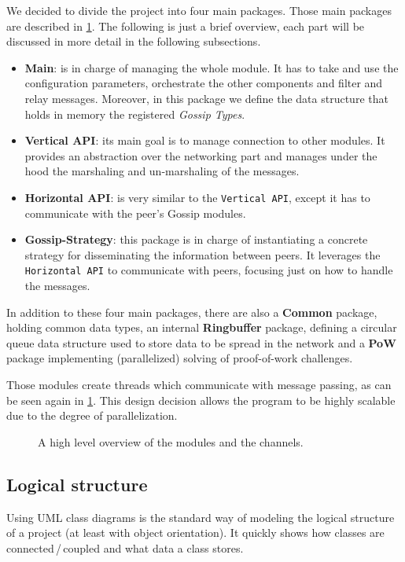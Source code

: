 \documentclass[a4paper,english,10pt,NET]{tumarticle}
\begin{document}
We decided to divide the project into four main packages. Those main packages are described in \cref{fig:overview}. The following is just a brief overview, each part will be discussed in more detail in the following subsections.

\begin{itemize}
	\item \textbf{Main}: is in charge of managing the whole module. It has to take and use the configuration parameters, orchestrate the other components and filter and relay messages. Moreover, in this package we define the data structure that holds in memory the registered \textit{Gossip Types}.
	\item \textbf{Vertical API}: its main goal is to manage connection to other modules. It provides an abstraction over the networking part and manages under the hood the marshaling and un-marshaling of the messages.
	\item \textbf{Horizontal API}: is very similar to the \texttt{Vertical API}, except it has to communicate with the peer's Gossip modules.
	\item \textbf{Gossip-Strategy}: this package is in charge of instantiating a concrete strategy for disseminating the information between peers. It leverages the \texttt{Horizontal API} to communicate with peers, focusing just on how to handle the messages.
\end{itemize}

In addition to these four main packages, there are also a \textbf{Common} package, holding common data types, an internal \textbf{Ringbuffer} package, defining a circular queue data structure used to store data to be spread in the network and a \textbf{PoW} package implementing (parallelized) solving of proof-of-work challenges.

Those modules create threads which communicate with message passing, as can be seen again in \cref{fig:overview}. This design decision allows the program to be highly scalable due to the degree of parallelization.

\begin{figure}
	\centering
	
	\caption{A high level overview of the modules and the channels.}
	\label{fig:overview}
\end{figure}

\subsection{Logical structure}
Using UML class diagrams is the standard way of modeling the logical structure of a project (at least with object orientation).
It quickly shows how classes are connected\,/\,coupled and what data a class stores.
\end{document}
